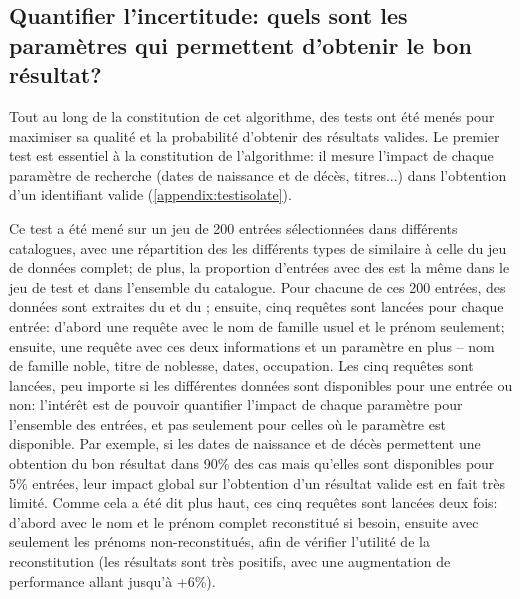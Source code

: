 

\subsection{Quantifier l'incertitude: quels sont les paramètres qui permettent d'obtenir le bon résultat?}
Tout au long de la constitution de cet algorithme, des tests ont été menés pour maximiser sa qualité et la probabilité d'obtenir des résultats valides. Le premier test est essentiel à la constitution de l'algorithme: il mesure l'impact de chaque paramètre de recherche (dates de naissance et de décès, titres...) dans l'obtention d'un identifiant valide (\ref{appendix:testisolate}).

Ce test a été mené sur un jeu de 200 entrées sélectionnées dans différents catalogues, avec une répartition des les différents types de \tname{} similaire à celle du jeu de données complet; de plus, la proportion d'entrées avec des \ttrait{} est la même dans le jeu de test et dans l'ensemble du catalogue. Pour chacune de ces 200 entrées, des données sont extraites du \tname{} et du \ttrait{}; ensuite, cinq requêtes sont lancées pour chaque entrée: d'abord une requête avec le nom de famille usuel et le prénom seulement; ensuite, une requête avec ces deux informations et un paramètre en plus -- nom de famille noble, titre de noblesse, dates, occupation. Les cinq requêtes sont lancées, peu importe si les différentes données sont disponibles pour une entrée ou non: l'intérêt est de pouvoir quantifier l'impact de chaque paramètre pour l'ensemble des entrées, et pas seulement pour celles où le paramètre est disponible. Par exemple, si les dates de naissance et de décès permettent une obtention du bon résultat dans 90\% des cas mais qu'elles sont disponibles pour 5\% entrées, leur impact global sur l'obtention d'un résultat valide est en fait très limité. Comme cela a été dit plus haut, ces cinq requêtes sont lancées deux fois: d'abord avec le nom et le prénom complet reconstitué si besoin, ensuite avec seulement les prénoms non-reconstitués, afin de vérifier l'utilité de la reconstitution (les résultats sont très positifs, avec une augmentation de performance allant jusqu'à +6\%).

